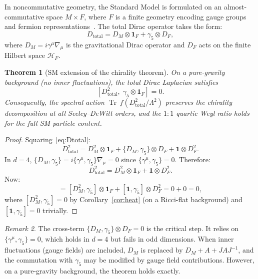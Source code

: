 \documentclass[12pt,a4paper]{article}
\newtheorem{theorem}{Theorem}[section]
\theoremstyle{definition}
\theoremstyle{remark}
\newtheorem{remark}[theorem]{Remark}
\newcommand{\Tr}{\operatorname{Tr}}
\newcommand{\Lam}{\Lambda}
\begin{document}
In noncommutative geometry, the Standard Model is formulated on an
almost-commutative space $M \times F$, where $F$ is a finite geometry
encoding gauge groups and fermion
representations~\cite{Chamseddine:2006ep,vanSuijlekom:2014pya}.
The total Dirac operator takes the form:
\begin{equation}\label{eq:Dtotal}
  D_{\mathrm{total}} = D_M \otimes \mathbf{1}_F + \gamma_5 \otimes D_F,
\end{equation}
where $D_M = i\gamma^\mu\nabla_\mu$ is the gravitational Dirac operator and
$D_F$ acts on the finite Hilbert space $\mathcal{H}_F$.

\begin{theorem}[SM extension of the chirality theorem]
\label{thm:sm}
On a pure-gravity background (no inner fluctuations), the total Dirac
Laplacian satisfies
\begin{equation}\label{eq:D2-sm}
  [D_{\mathrm{total}}^2,\; \gamma_5 \otimes \mathbf{1}_F] = 0.
\end{equation}
Consequently, the spectral action $\Tr\,f(D_{\mathrm{total}}^2/\Lam^2)$
preserves the chirality decomposition at all Seeley--DeWitt orders, and the
$1{:}1$ quartic Weyl ratio holds for the full SM particle content.
\end{theorem}

\begin{proof}
Squaring~\eqref{eq:Dtotal}:
\begin{equation}\label{eq:D2total}
  D_{\mathrm{total}}^2 = D_M^2 \otimes \mathbf{1}_F
  + \{D_M, \gamma_5\} \otimes D_F
  + \mathbf{1} \otimes D_F^2.
\end{equation}
In $d = 4$, $\{D_M, \gamma_5\} = i\{\gamma^\mu, \gamma_5\}\nabla_\mu = 0$
since $\{\gamma^\mu, \gamma_5\} = 0$.  Therefore:
\begin{equation}
  D_{\mathrm{total}}^2 = D_M^2 \otimes \mathbf{1}_F
  + \mathbf{1} \otimes D_F^2.
\end{equation}
Now:
\begin{equation}
  [D_{\mathrm{total}}^2,\; \gamma_5 \otimes \mathbf{1}_F]
  = [D_M^2, \gamma_5] \otimes \mathbf{1}_F
  + [\mathbf{1}, \gamma_5] \otimes D_F^2
  = 0 + 0 = 0,
\end{equation}
where $[D_M^2, \gamma_5] = 0$ by Corollary~\ref{cor:heat} (on a Ricci-flat
background) and $[\mathbf{1}, \gamma_5] = 0$ trivially.
\end{proof}

\begin{remark}
The cross-term $\{D_M, \gamma_5\} \otimes D_F = 0$ is the critical step.
It relies on $\{\gamma^\mu, \gamma_5\} = 0$, which holds in $d = 4$ but
fails in odd dimensions.  When inner fluctuations (gauge fields) are included,
$D_M$ is replaced by $D_M + A + JAJ^{-1}$, and the commutation with
$\gamma_5$ may be modified by gauge field contributions.  However, on a
pure-gravity background, the theorem holds exactly.
\end{remark}
\end{document}
